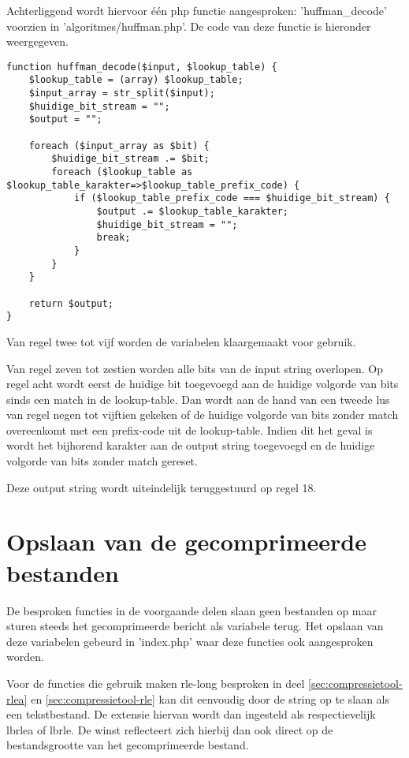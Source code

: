 Achterliggend wordt hiervoor één \gls{php} functie aangesproken: 'huffman\_decode' voorzien in 'algoritmes/huffman.php'. De code van deze functie is hieronder weergegeven.

\begin{lstlisting}
function huffman_decode($input, $lookup_table) {
	$lookup_table = (array) $lookup_table;
	$input_array = str_split($input);
	$huidige_bit_stream = "";
	$output = "";
	
	foreach ($input_array as $bit) {
		$huidige_bit_stream .= $bit;
		foreach ($lookup_table as $lookup_table_karakter=>$lookup_table_prefix_code) {
			if ($lookup_table_prefix_code === $huidige_bit_stream) {
				$output .= $lookup_table_karakter;
				$huidige_bit_stream = "";
				break;
			}
		}
	}
	
	return $output;
}
\end{lstlisting}

Van regel twee tot vijf worden de variabelen klaargemaakt voor gebruik. 

Van regel zeven tot zestien worden alle \glspl{bit} van de input string overlopen. Op regel acht wordt eerst de huidige \gls{bit} toegevoegd aan de huidige volgorde van \glspl{bit} sinds een match in de \gls{lookup-table}. Dan wordt aan de hand van een tweede lus van regel negen tot vijftien gekeken of de huidige volgorde van \glspl{bit} zonder match overeenkomt met een \gls{prefix-code} uit de \gls{lookup-table}. Indien dit het geval is wordt het bijhorend karakter aan de output \gls{string} toegevoegd en de huidige volgorde van \glspl{bit} zonder match gereset. 

Deze output \gls{string} wordt uiteindelijk teruggestuurd op regel 18.

\section{Opslaan van de gecomprimeerde bestanden}
\label{sec:compressietool-opslaan}

De besproken functies in de voorgaande delen slaan geen bestanden op maar sturen steeds het gecomprimeerde bericht als variabele terug. Het opslaan van deze variabelen gebeurd in 'index.php' waar deze functies ook aangesproken worden. 

Voor de functies die gebruik maken \gls{rle-long} besproken in deel \ref{sec:compressietool-rlea} en \ref{sec:compressietool-rle} kan dit eenvoudig door de \gls{string} op te slaan als een tekstbestand. De extensie hiervan wordt dan ingesteld als respectievelijk \gls{lbrlea} of \gls{lbrle}. De winst reflecteert zich hierbij dan ook direct op de bestandsgrootte van het gecomprimeerde bestand.


